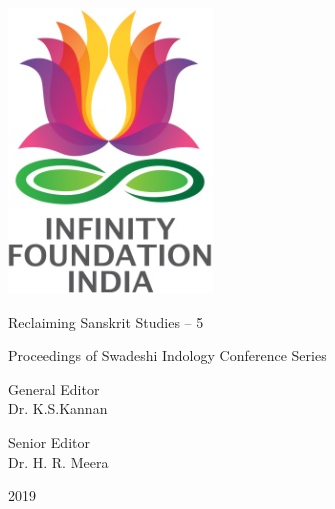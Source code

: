 \thispagestyle{empty}

\includegraphics{images/logo.png}

Reclaiming Sanskrit Studies – 5


Proceedings of Swadeshi Indology Conference Series

General Editor\\ Dr. K.S.Kannan

Senior Editor\\ Dr. H. R. Meera


2019

